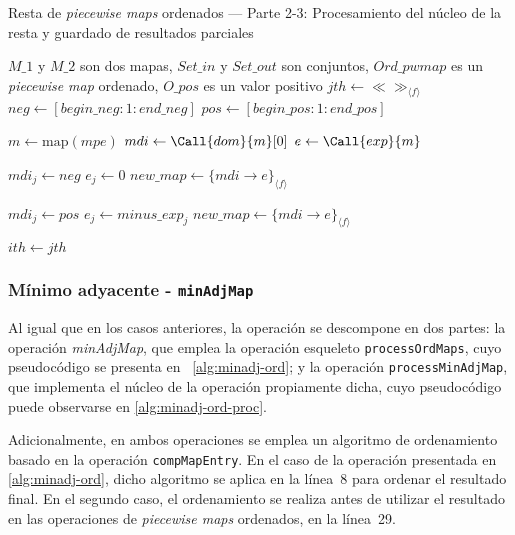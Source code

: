 \begin{algorithm}
\caption{Resta de \textit{piecewise maps} ordenados — Parte 2-3: Procesamiento del núcleo de la resta y guardado de resultados parciales}
\label{alg:resta-nuecleo-ord3}
\begin{algorithmic}[1]
\Require $M\_1$ y $M\_2$ son dos mapas, $Set\_in$ y $Set\_out$ son conjuntos, $Ord\_pwmap$ es un \textit{piecewise map} ordenado, $O\_pos$ es un valor positivo
 \State $jth \gets \ll\gg_{\langle f \rangle}$
        \State $neg \gets [begin\_neg: 1: end\_neg]$
        \State $pos \gets [begin\_pos: 1: end\_pos]$

            \State $m \gets \mathrm{map}(mpe)$
            \State $mdi \gets \Call{dom}{m}[0]$
            \State $e \gets \Call{exp}{m}$

                \State $mdi_j \gets neg$
                \State $e_j \gets 0$
                \State $new\_map \gets \{mdi \rightarrow e\}_{\langle f \rangle}$
                \State {}
            \EndIf

                \State $mdi_j \gets pos$
                \State $e_j \gets minus\_exp_j$
                \State $new\_map \gets \{mdi \rightarrow e\}_{\langle f \rangle}$
                \State {}
            \EndIf
        \EndFor

        \State $ith \gets jth$
\EndFunction
\end{algorithmic}
\end{algorithm}

\subsubsection{Mínimo adyacente - \texttt{minAdjMap}}

Al igual que en los casos anteriores, la operación se descompone en dos partes:  
la operación \textit{minAdjMap}, que emplea la operación esqueleto \texttt{processOrdMaps}, cuyo pseudocódigo se presenta en ~\ref{alg:minadj-ord};  
y la operación \texttt{processMinAdjMap}, que implementa el núcleo de la operación propiamente dicha, 
cuyo pseudocódigo puede observarse en \ref{alg:minadj-ord-proc}.

Adicionalmente, en ambos operaciones se emplea un algoritmo de ordenamiento 
basado en la operación \texttt{compMapEntry}.  
En el caso de la operación presentada en \ref{alg:minadj-ord}, dicho algoritmo 
se aplica en la línea~8 para ordenar el resultado final.  
En el segundo caso, el ordenamiento se realiza antes de utilizar el resultado 
en las operaciones de \textit{piecewise maps} ordenados, en la línea~29.

